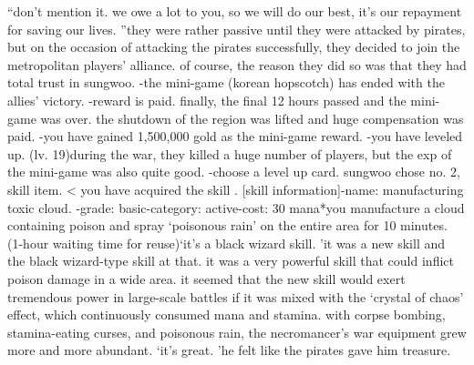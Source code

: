 “don’t mention it.
 we owe a lot to you, so we will do our best, it’s our repayment for saving our lives.
”they were rather passive until they were attacked by pirates, but on the occasion of attacking the pirates successfully, they decided to join the metropolitan players’ alliance.
 of course, the reason they did so was that they had total trust in sungwoo.
-the mini-game (korean hopscotch) has ended with the allies’ victory.
-reward is paid.
finally, the final 12 hours passed and the mini-game was over.
 the shutdown of the region was lifted and huge compensation was paid.
-you have gained 1,500,000 gold as the mini-game reward.
-you have leveled up.
 (lv.
 19)during the war, they killed a huge number of players, but the exp of the mini-game was also quite good.
-choose a level up card.
sungwoo chose no.
 2, skill item.
< you have acquired the skill .
[skill information]-name: manufacturing toxic cloud.
-grade: basic-category: active-cost: 30 mana*you manufacture a cloud containing poison and spray ‘poisonous rain’ on the entire area for 10 minutes.
 (1-hour waiting time for reuse)‘it’s a black wizard skill.
’it was a new skill and the black wizard-type skill at that.
 it was a very powerful skill that could inflict poison damage in a wide area.
 it seemed that the new skill would exert tremendous power in large-scale battles if it was mixed with the ‘crystal of chaos’ effect, which continuously consumed mana and stamina.
with corpse bombing, stamina-eating curses, and poisonous rain, the necromancer’s war equipment grew more and more abundant.
‘it’s great.
’he felt like the pirates gave him treasure.


 